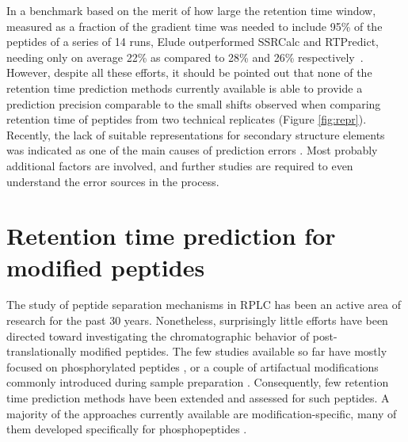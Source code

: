 \documentclass[a4paper]{article}
\begin{document}
In a benchmark based on the merit of how large the retention time
window, measured as a fraction of the gradient time was needed to
include 95\% of the peptides of a series of 14 runs, {\sc Elude}
outperformed {\sc SSRCalc} and {\sc RTPredict}, needing only on
average 22\% as compared to 28\% and 26\%
respectively~\cite{elude1}. However, despite all these efforts, it
should be pointed out that none of the retention time prediction
methods currently available is able to provide a prediction precision
comparable to the small shifts observed when comparing retention time
of peptides from two technical replicates (Figure
\ref{fig:repr}). Recently, the lack of suitable representations for
secondary structure elements was indicated as one of the main causes
of prediction errors \cite{Reimer2012}.  Most probably additional
factors are involved, and further studies are required to even
understand the error sources in the process.

\section{\label{sec:rtpredm}Retention time prediction for modified peptides}

The study of peptide separation mechanisms in RPLC has been an active
area of research for the past 30 years. Nonetheless, surprisingly
little efforts have been directed toward investigating the
chromatographic behavior of post-translationally modified
peptides. The few studies available so far have mostly focused on
phosphorylated peptides \cite{Kim2007}, or a couple of artifactual
modifications commonly introduced during sample preparation
\cite{Reimer2011}. Consequently, few retention time prediction methods
have been extended and assessed for such peptides. A majority of the
approaches currently available are modification-specific, many of them
developed specifically for phosphopeptides \cite{Kawakami2005,
  perlova2010}.
\end{document}
